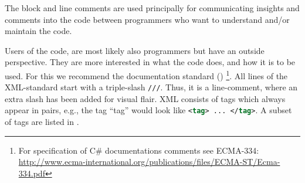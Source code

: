 \documentclass[fsharpNotes.tex]{subfiles}
\begin{document}
The block and line comments are used principally for communicating insights and comments into the code between programmers who want to understand and/or maintain the code. 

Users of the code, are most likely also programmers but have an outside perspective. They are more interested in what the code does, and how it is to be used. For this we recommend the  documentation standard () \footnote{For specification of C\# documentations comments see ECMA-334: \url{http://www.ecma-international.org/publications/files/ECMA-ST/Ecma-334.pdf}}. All lines of the XML-standard start with a triple-slash \lstinline{///}. Thus, it is a line-comment, where an extra slash has been added for visual flair. XML consists of tags which always appear in pairs, e.g., the tag ``tag'' would look like \lstinline[language=xml]!<tag> ... </tag>!. A subset of tags are listed in .
\end{document}
